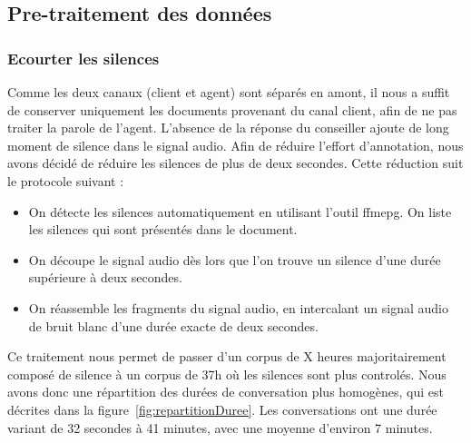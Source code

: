 \subsection{Pre-traitement des données}

\subsubsection{Ecourter les silences}
Comme les deux canaux (client et agent) sont séparés en amont, il nous a suffit de conserver uniquement les documents provenant du canal client, afin de ne pas traiter la parole de l'agent.
L'absence de la réponse du conseiller ajoute de long moment de silence dans le signal audio. Afin de réduire l'effort d'annotation, nous avons décidé de réduire les silences de plus de deux secondes. Cette réduction suit le protocole suivant :
\begin{itemize}
  \item On détecte les silences automatiquement en utilisant l'outil ffmepg. On liste les silences qui sont présentés dans le document.
  \item On découpe le signal audio dès lors que l'on trouve un silence d'une durée supérieure à deux secondes.
  \item On réassemble les fragments du signal audio, en intercalant un signal audio de bruit blanc d'une durée exacte de deux secondes.
\end{itemize}

Ce traitement nous permet de passer d'un corpus de X heures majoritairement composé de silence à un corpus de 37h où les silences sont plus controlés. Nous avons donc une répartition des durées de conversation plus homogènes, qui est décrites dans la figure~\ref{fig:repartitionDuree}. Les conversations ont une durée variant de 32 secondes à 41 minutes, avec une moyenne d'environ 7 minutes.


